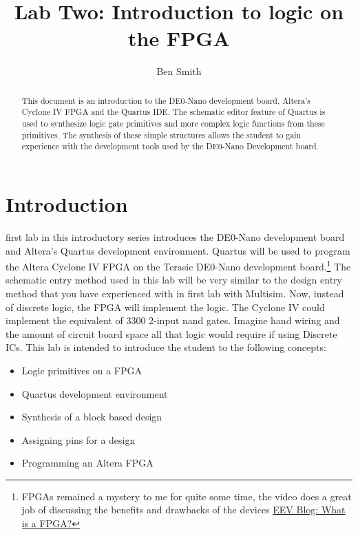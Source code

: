 \title{Lab Two: Introduction to logic on the FPGA}
\author{Ben Smith}



\maketitle

  \begin{abstract}
    This document is an introduction to the DE0-Nano development board, Altera's Cyclone IV FPGA and the Quartus IDE. The schematic editor feature of Quartus is used to synthesize logic gate primitives and more complex logic functions from these primitives. The synthesis of these simple structures allows the student to gain experience with the development tools used by the DE0-Nano Development board.
  \end{abstract}

  \section{Introduction}
     first lab in this introductory series introduces the DE0-Nano development board and Altera's Quartus development environment. Quartus will be used to program the Altera Cyclone IV FPGA on the Terasic DE0-Nano development board.\footnote{FPGAs remained a mystery to me for quite some time, the video does a great job of discussing the benefits and drawbacks of the devices \href{https://www.youtube.com/watch?v=gUsHwi4M4xE}{EEV Blog: What is a FPGA?}}  The schematic entry method used in this lab will be very similar to the design entry method that you have experienced with in first lab with Multisim. Now, instead of discrete logic, the FPGA will implement the logic. The Cyclone IV could implement the equivalent of 3300 2-input nand gates. Imagine hand wiring and the amount of circuit board space all that logic would require if using Discrete ICs. This lab is intended to introduce the student to the following concepts:
    \begin{itemize}
       \item Logic primitives on a FPGA
       \item Quartus development environment
       \item Synthesis of a block based design
       \item Assigning pins for a design
       \item Programming an Altera FPGA
    \end{itemize}

